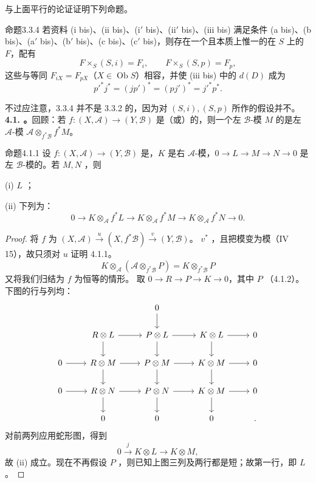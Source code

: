 与上面平行的论证证明下列命题。
\begin{SGAresult}{命题}{3.3.4}
若资料 (i bis)、(ii bis)、(i$'$ bis)、(ii$'$ bis)、(iii bis) 满足条件 (a bis)、(b bis)、(a$'$ bis)、(b$'$ bis)、(c bis)、(c$'$ bis)，则存在一个且本质上惟一的在 $S$ 上的 $F$，配有
\[F\times_S(S,i)=F_i,\qquad F\times_S(S,p)=F_p,\]
这些与等同 $F_{iX}=F_{pX}$（$X\in\operatorname{Ob}S$）相容，并使 (iii bis) 中的 $d(D)$ 成为
\[p'^*j^*=(jp')^*=(pj')^*=j'^*p^*.\]
\end{SGAresult}
不过应注意，3.3.4 并不是 3.3.2 的，因为对 $(S,i),(S,p)$ 所作的假设并不。
\textbf{4.1. 。}回顾：若 $f:(X,\mathscr A)\to(Y,\mathscr B)$ 是（或）的，则一个左 $\mathscr B$-模 $M$ 的是左 $\mathscr A$-模 $\mathscr A\otimes_{f^*\mathscr B}f^*M$。
\begin{SGAresult}{命题}{4.1.1}
设 $f:(X,\mathscr A)\to(Y,\mathscr B)$ 是，$K$ 是右 $\mathscr A$-模，$0\to L\to M\to N\to0$ 是左 $\mathscr B$-模的。若 $M,N$ ，则

(i) $L$ ；

(ii) 下列为：
\[0\longrightarrow K\otimes_{\mathscr A}f^*L\longrightarrow K\otimes_{\mathscr A}f^*M\longrightarrow K\otimes_{\mathscr A}f^*N\longrightarrow0.\]
\end{SGAresult}
\begin{proof}
将 $f$ 为 $(X,\mathscr A)\xrightarrow{u}(X,f^*\mathscr B)\xrightarrow{v}(Y,\mathscr B)$。 $v^*$ ，且把模变为模（IV 15），故只须对 $u$ 证明 4.1.1。
\[K\otimes_{\mathscr A}(\mathscr A\otimes_{f^*\mathscr B}P)=K\otimes_{f^*\mathscr B}P\tag{4.1.1.1}\]
又将我们归结为 $f$ 为恒等的情形。
取 $0\to R\to P\to K\to0$，其中 $P$ （4.1.2）。下图的行与列均：
\[\begin{tikzcd}& &0\arrow[d]&&\\&R\otimes L\arrow[r]\arrow[d]&P\otimes L\arrow[r]\arrow[d]&K\otimes L\arrow[r]\arrow[d]&0\\0\arrow[r]&R\otimes M\arrow[r]\arrow[d]&P\otimes M\arrow[r]\arrow[d]&K\otimes M\arrow[r]\arrow[d]&0\\0\arrow[r]&R\otimes N\arrow[r]\arrow[d]&P\otimes N\arrow[r]\arrow[d]&K\otimes M\arrow[r]\arrow[d]&0\\&0&0&0&.\end{tikzcd}\]
对前两列应用蛇形图，得到
\[0\xrightarrow{j}K\otimes L\longrightarrow K\otimes M,\]
故 (ii) 成立。现在不再假设 $P$ ，则已知上图三列及两行都是短；故第一行，即 $L$ 。
\end{proof}
